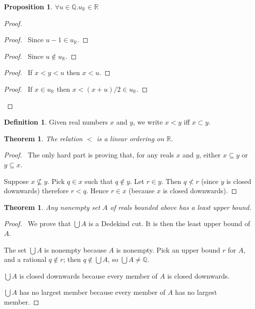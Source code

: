 \documentclass{article}
\let\qed\relax
\newtheorem{proposition}[axiom]{Proposition}
\newtheorem{theorem}[axiom]{Theorem}
\theoremstyle{definition}
\newtheorem{definition}[axiom]{Definition}
\begin{document}
    \begin{proposition}
        $\forall u \in \mathbb{Q}. u_\mathbb{R} \in \mathbb{R}$
    \end{proposition}

    \begin{proof}
        \pf
        \begin{proof}
            \pf\ Since $u-1 \in u_\mathbb{R}$.
        \end{proof}
        \begin{proof}
            \pf\ Since $u \notin u_\mathbb{R}$.
        \end{proof}
        \begin{proof}
            \pf\ If $x < y < u$ then $x < u$.
        \end{proof}
        \begin{proof}
            \pf\ If $x \in u_\mathbb{R}$ then $x < (x+u)/2 \in u_\mathbb{R}$.
        \end{proof}
        \qed
    \end{proof}
    \begin{definition}
        Given real numbers $x$ and $y$, we write $x < y$ iff $x \subset y$.
    \end{definition}

    \begin{theorem}
        The relation $<$ is a linear ordering on $\mathbb{R}$.
    \end{theorem}

    \begin{proof}
        \pf\ The only hard part is proving that, for any reals $x$ and $y$, either $x \subseteq y$ or
        $y \subseteq x$.

        Suppose $x \nsubseteq y$. Pick $q \in x$ such that $q \notin y$. Let $r \in y$. Then $q \nless r$
        (since $y$ is closed downwards) therefore $r < q$. Hence $r \in x$ (because $x$ is closed downwards).
        \qed
    \end{proof}

    \begin{theorem}
        Any nonempty set $A$ of reals bounded above has a least upper bound.
    \end{theorem}

    \begin{proof}
        \pf\ We prove that $\bigcup A$ is a Dedekind cut. It is then the least upper bound of $A$.

        The set $\bigcup A$ is nonempty because $A$ is nonempty. Pick an upper bound $r$ for $A$, and a
        rational $q \notin r$; then $q \notin \bigcup A$, so $\bigcup A \neq \mathbb{Q}$.

        $\bigcup A$ is closed downwards because every member of $A$ is closed downwards.

        $\bigcup A$ has no largest member because every member of $A$ has no largest member. \qed
    \end{proof}
\end{document}
